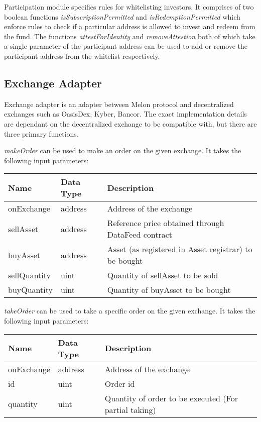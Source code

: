 \documentclass[conference]{IEEEtran}
\begin{document}
Participation module specifies rules for whitelisting investors. It comprises of two boolean functions \textit{isSubscriptionPermitted} and \textit{isRedemptionPermitted} which enforce rules to check if a particular address is allowed to invest and redeem from the fund. The functions \textit{attestForIdentity} and \textit{removeAttestion} both of which take a single parameter of the participant address can be used to add or remove  the participant address from the whitelist respectively. 

\subsection{Exchange Adapter}

Exchange adapter is an adapter between Melon protocol and decentralized exchanges such as OasisDex, Kyber, Bancor. The exact implementation details are dependant on the decentralized exchange to be compatible with, but there are three primary functions.

\textit{makeOrder} can be used to make an order on the given exchange. It takes the following input parameters:
\begin{center}
	\footnotesize
	\begin{tabular}{ | p{2.7cm} | p{0.8cm} | p{4cm} | }
		\hline
		Name & Data Type & Description \\ \hline
		onExchange & address & Address of the exchange \\ \hline
		sellAsset & address &  Reference price obtained through DataFeed contract \\ \hline
		buyAsset & address & Asset (as registered in Asset registrar) to be bought \\ \hline
		sellQuantity & uint & Quantity of sellAsset to be sold \\ \hline
		buyQuantity & uint & Quantity of buyAsset to be bought \\ \hline
	\end{tabular}
\end{center}

\textit{takeOrder} can be used to take a specific order on the given exchange. It takes the following input parameters:
\begin{center}
	\footnotesize
	\begin{tabular}{ | p{2.7cm} | p{0.8cm} | p{4cm} | }
		\hline
		Name & Data Type & Description \\ \hline
		onExchange & address & Address of the exchange \\ \hline
		id & uint & Order id \\ \hline
		quantity & uint & Quantity of order to be executed (For partial taking) \\ \hline
	\end{tabular}
\end{center}
\end{document}
